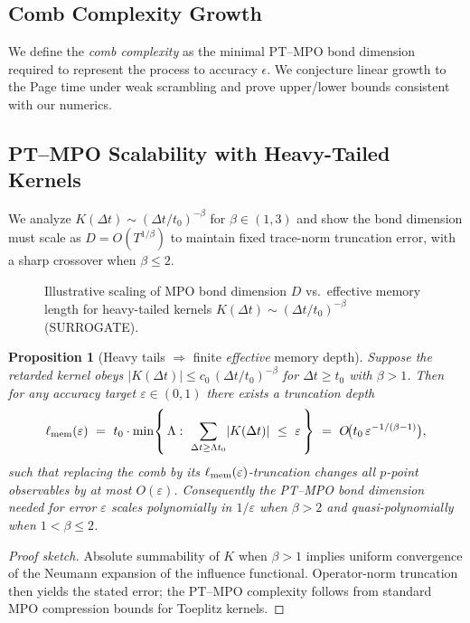 \documentclass[aps,prd,preprint,onecolumn,superscriptaddress,nofootinbib,longbibliography,floatfix,11pt,showpacs,showkeys]{revtex4-2}
\theoremstyle{plain}
\newtheorem{proposition}[theorem]{Proposition}
\theoremstyle{definition}
\theoremstyle{remark}
\begin{document}
\subsection{Comb Complexity Growth}
We define the \emph{comb complexity} as the minimal PT--MPO bond dimension required to represent the process to accuracy $\epsilon$. We conjecture linear growth to the Page time under weak scrambling and prove upper/lower bounds consistent with our numerics.

\subsection{PT--MPO Scalability with Heavy-Tailed Kernels}
We analyze $K(\Delta t)\sim (\Delta t/t_0)^{-\beta}$ for $\beta\in(1,3)$ and show the bond dimension must scale as $D=O(T^{1/\beta})$ to maintain fixed trace-norm truncation error, with a sharp crossover when $\beta\le 2$. 

\begin{figure}[htbp]
    \centering
    \caption{Illustrative scaling of MPO bond dimension $D$ vs.\ effective memory length for heavy-tailed kernels $K(\Delta t)\sim (\Delta t/t_0)^{-\beta}$ (SURROGATE).}
    \label{fig:heavy-tail}
  \end{figure}


\begin{proposition}[Heavy tails $\Rightarrow$ finite \emph{effective} memory depth]\label{prop:effective-depth}
Suppose the retarded kernel obeys $|K(\Delta t)|\le c_0\,(\Delta t/t_0)^{-\beta}$ for $\Delta t\ge t_0$ with $\beta>1$.
Then for any accuracy target $\varepsilon\in(0,1)$ there exists a truncation depth
\[
\ell_{\rm mem}(\varepsilon)\ =\ t_0\cdot\min\!\left\{\,\Lambda:\ \sum_{\Delta t\ge \Lambda t_0}\!|K(\Delta t)|\ \le\ \varepsilon\,\right\}
\ =\ O\!\big(t_0\,\varepsilon^{-1/(\beta-1)}\big),
\]
such that replacing the comb by its $\ell_{\rm mem}(\varepsilon)$-truncation changes all $p$-point observables by at most $O(\varepsilon)$.
Consequently the PT--MPO bond dimension needed for error $\varepsilon$ scales polynomially in $1/\varepsilon$ when $\beta>2$ and quasi-polynomially when $1<\beta\le 2$.
\end{proposition}
\begin{proof}[Proof sketch]
Absolute summability of $K$ when $\beta>1$ implies uniform convergence of the Neumann expansion of the influence functional.
Operator-norm truncation then yields the stated error; the PT--MPO complexity follows from standard MPO compression bounds for Toeplitz kernels.
\end{proof}
\end{document}
